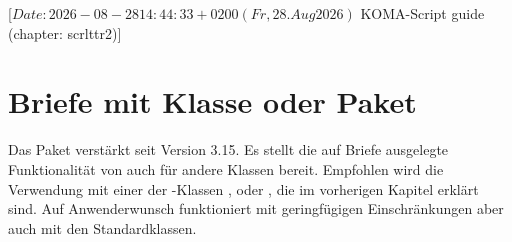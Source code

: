 %
%
%
%
%
%
%

%
                 [$Date: 2026-08-28 14:44:33 +0200 (Fr, 28. Aug 2026) $
                  KOMA-Script guide (chapter: scrlttr2)]

\chapter{Briefe mit Klasse  oder Paket }

\BeginIndexGroup
{}%
%
\iffalse%
Briefe sind in vielerlei Hinsicht etwas ganz anderes als Artikel, Berichte,
Bücher oder Ähnliches. Schon allein deshalb gibt es für Briefe ein eigenes
Kapitel.%
%
\fi%

%

Das Paket %
 verstärkt \KOMAScript{} seit Version
3.15. Es stellt die auf Briefe ausgelegte Funktionalität von 
auch für andere Klassen bereit. Empfohlen wird die Verwendung mit einer der
\KOMAScript-Klassen ,  oder ,
die im vorherigen Kapitel erklärt sind. %
\iffalse %
Mit geringfügigen Einschränkungen funktioniert \Package{scrletter}%
\else %
Auf Anwenderwunsch funktioniert  mit geringfügigen
Einschränkungen %
\fi %
aber auch mit den Standardklassen.

